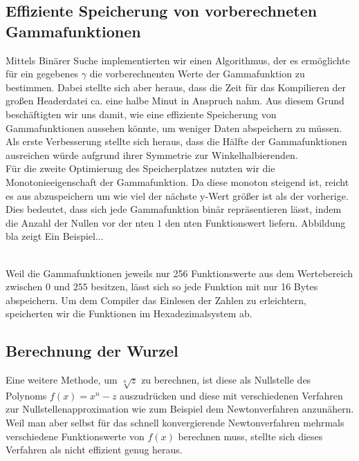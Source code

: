 \documentclass[course=erap]{aspdoc}
\begin{document}
\subsection{Effiziente Speicherung von vorberechneten Gammafunktionen}
Mittels Binärer Suche implementierten wir einen Algorithmus, der es ermöglichte für ein gegebenes $\gamma$ die vorberechnenten Werte der Gammafunktion zu bestimmen.  Dabei stellte sich aber heraus, dass die Zeit für das Kompilieren der großen Headerdatei ca. eine halbe Minut in Anspruch nahm. Aus diesem Grund beschäftigten wir uns damit, wie eine effiziente Speicherung von Gammafunktionen aussehen könnte, um weniger Daten abspeichern zu müssen. 
\\
\newline
\noindent
Als erste Verbesserung stellte sich heraus, dass die Hälfte der Gammafunktionen ausreichen würde aufgrund ihrer Symmetrie zur Winkelhalbierenden. %
\\
\newline
\noindent
Für die zweite Optimierung des Speicherplatzes nutzten wir die Monotonieeigenschaft der Gammafunktion. Da diese monoton steigend ist, reicht es aus abzuspeichern um wie viel der nächste y-Wert größer ist als der vorherige. Dies bedeutet, dass sich jede Gammafunktion binär repräsentieren lässt, indem die Anzahl der Nullen vor der nten $1$ den nten Funktionswert liefern. Abbildung bla zeigt Ein Beispiel...

\\
\newline
\noindent
Weil die Gammafunktionen jeweils nur 256 Funktionswerte aus dem Wertebereich zwischen $0$ und $255$ besitzen, lässt sich so jede Funktion mit nur 16 Bytes abspeichern. Um dem Compiler das Einlesen der Zahlen zu erleichtern, speicherten wir die Funktionen im Hexadezimalsystem ab.  
\subsection{Berechnung der Wurzel}
Eine weitere Methode, um $\sqrt[n]{z}$ zu berechnen, ist diese als Nullstelle des Polynoms $f(x)=x^n-z$ auszudrücken und diese mit verschiedenen Verfahren zur Nullstellenapproximation wie zum Beispiel dem Newtonverfahren anzunähern. Weil man aber selbst für das schnell konvergierende Newtonverfahren mehrmals verschiedene Funktionswerte von $f(x)$ berechnen muss, stellte sich dieses Verfahren als nicht effizient genug heraus.     
\end{document}
